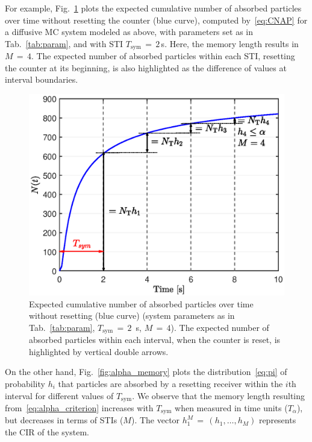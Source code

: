 \documentclass[journal]{IEEEtranTCOM}
\begin{document}
\par For example, Fig.~\ref{fig:CNAP} plots the expected cumulative number of absorbed particles over time without resetting the counter (blue curve), computed by~\eqref{eq:CNAP} for a diffusive MC system modeled as above, with parameters set as in Tab.~\ref{tab:param}, and with STI $T_{\mathrm{sym}}$$\,=\,$$2\,$s. Here, the memory length results in $M$$\,=\,$$4$. The expected number of absorbed particles within each STI, resetting the counter at its beginning, is also highlighted as the difference of values at interval boundaries.
\begin{figure}
    \centering
    \includegraphics[width=1\columnwidth]{Figures/CNAP.eps}
    \caption{Expected cumulative number of absorbed particles over time without resetting (blue curve) (system parameters as in Tab.~\ref{tab:param}, $T_{\mathrm{sym}}$$\,=\,$$2$~s, $M$$\,=\,$$4$). The expected number of absorbed particles within each interval, when the counter is reset, is highlighted by vertical double arrows.}  
    \label{fig:CNAP}
\end{figure}
On the other hand, Fig.~\ref{fig:alpha_memory} plots the distribution~\eqref{eq:pi} of probability $h_{i}$ that particles are absorbed by a resetting receiver within the $i$th interval for different values of $T_{\mathrm{sym}}$. We observe that the memory length resulting from~\eqref{eq:alpha_criterion} increases with $T_{\mathrm{sym}}$ when measured in time units ($T_{\alpha}$), but decreases in terms of STIs ($M$). The vector $h_{1}^{M}$$\,=\,$$(h_{1},\ldots,h_{M})$ represents the CIR of the system.
\end{document}
